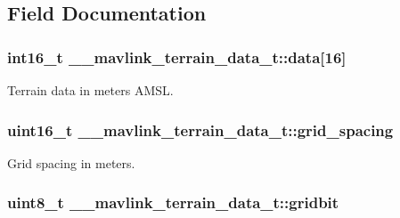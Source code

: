 \subsection{Field Documentation}
\hypertarget{struct____mavlink__terrain__data__t_a45c3b14fcfab857128e407c4beb43666}{
\subsubsection[{data}]{\setlength{\rightskip}{0pt plus 5cm}int16\+\_\+t \+\_\+\+\_\+mavlink\+\_\+terrain\+\_\+data\+\_\+t\+::data\mbox{[}16\mbox{]}}}\label{struct____mavlink__terrain__data__t_a45c3b14fcfab857128e407c4beb43666}


Terrain data in meters A\+M\+S\+L. 

\hypertarget{struct____mavlink__terrain__data__t_a4aecaef23ec7f19bc3bf773c4858d758}{
\subsubsection[{grid\+\_\+spacing}]{\setlength{\rightskip}{0pt plus 5cm}uint16\+\_\+t \+\_\+\+\_\+mavlink\+\_\+terrain\+\_\+data\+\_\+t\+::grid\+\_\+spacing}}\label{struct____mavlink__terrain__data__t_a4aecaef23ec7f19bc3bf773c4858d758}


Grid spacing in meters. 

\hypertarget{struct____mavlink__terrain__data__t_ab7f84393c0e101ca9e90e347caba9006}{
\subsubsection[{gridbit}]{\setlength{\rightskip}{0pt plus 5cm}uint8\+\_\+t \+\_\+\+\_\+mavlink\+\_\+terrain\+\_\+data\+\_\+t\+::gridbit}}\label{struct____mavlink__terrain__data__t_ab7f84393c0e101ca9e90e347caba9006}


